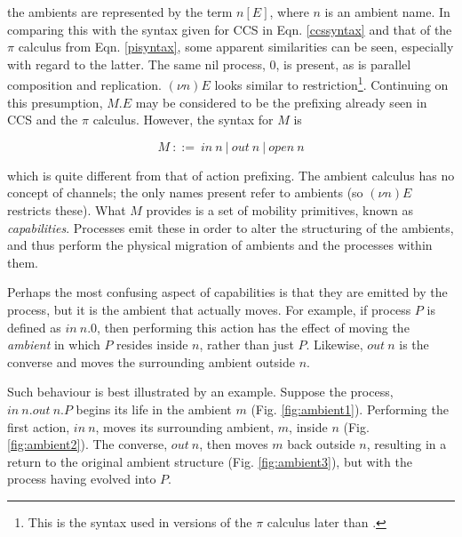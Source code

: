\noindent the ambients are represented by the term $n[E]$, where $n$
is an ambient name.  In comparing this with the syntax given for CCS
in Eqn. \ref{ccssyntax} and that of the $\pi$ calculus from Eqn.
\ref{pisyntax}, some apparent similarities can be seen, especially
with regard to the latter.  The same nil process, $0$, is present, as
is parallel composition and replication.  $(\nu n)E$ looks similar to
restriction\footnote{This is the syntax used in versions of the $\pi$
  calculus later than \cite{funcproc}.}.  Continuing on this
presumption, $M.E$ may be considered to be the prefixing already seen
in CCS and the $\pi$ calculus.  However, the syntax for $M$ is

\begin{equation}
\label{ambsyntaxcap}
  M\ ::=\ 
  in\ n\ |\
  out\ n\ | \
  open\ n
\end{equation}

\noindent which is quite different from that of action prefixing.  The
ambient calculus has no concept of channels; the only names present
refer to ambients (so $(\nu n)E$ restricts these).  What $M$ provides
is a set of mobility primitives, known as \emph{capabilities}.
Processes emit these in order to alter the structuring of the
ambients, and thus perform the physical migration of ambients and the
processes within them.

Perhaps the most confusing aspect of capabilities is that they are
emitted by the process, but it is the ambient that actually moves.
For example, if process $P$ is defined as $in\ n.0$, then performing
this action has the effect of moving the \emph{ambient} in which $P$
resides inside $n$, rather than just $P$.  Likewise, $out\ n$ is the
converse and moves the surrounding ambient outside $n$.

Such behaviour is best illustrated by an example. Suppose the process,
$in\ n.out\ n.P$ begins its life in the ambient $m$
(Fig. \ref{fig:ambient1}).  Performing the first action, $in\ n$,
moves its surrounding ambient, $m$, inside $n$
(Fig. \ref{fig:ambient2}).  The converse, $out\ n$, then moves $m$
back outside $n$, resulting in a return to the original ambient
structure (Fig. \ref{fig:ambient3}), but with the process having
evolved into $P$.

